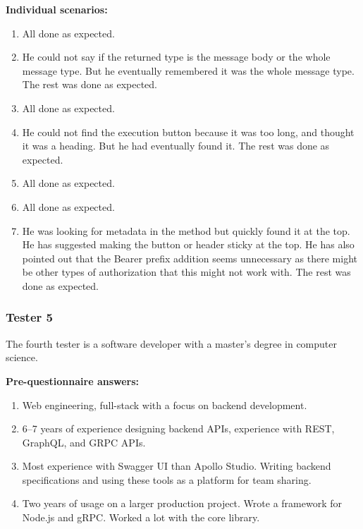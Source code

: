 \textbf{Individual scenarios:}
\begin{enumerate}
    \item All done as expected.
    \item He could not say if the returned type is the message body or the whole message type.
    But he eventually remembered it was the whole message type.
    The rest was done as expected.
    \item All done as expected.
    \item He could not find the execution button because it was too long, and thought it was a heading.
    But he had eventually found it.
    The rest was done as expected.
    \item All done as expected.
    \item All done as expected.
    \item He was looking for metadata in the method but quickly found it at the top.
    He has suggested making the button or header sticky at the top.
    He has also pointed out that the Bearer prefix addition seems unnecessary as there might be other types of authorization that this might not work with.
    The rest was done as expected.
\end{enumerate}

\subsubsection{Tester 5}
The fourth tester is a software developer with a master's degree in computer science.

\textbf{Pre-questionnaire answers:}
\begin{enumerate}
    \item Web engineering, full-stack with a focus on backend development.
    \item 6--7 years of experience designing backend APIs, experience with REST, GraphQL, and GRPC APIs.
    \item Most experience with Swagger UI than Apollo Studio.
    Writing backend specifications and using these tools as a platform for team sharing.
    \item Two years of usage on a larger production project.
    Wrote a framework for Node.js and gRPC\@.
    Worked a lot with the core library.
\end{enumerate}

